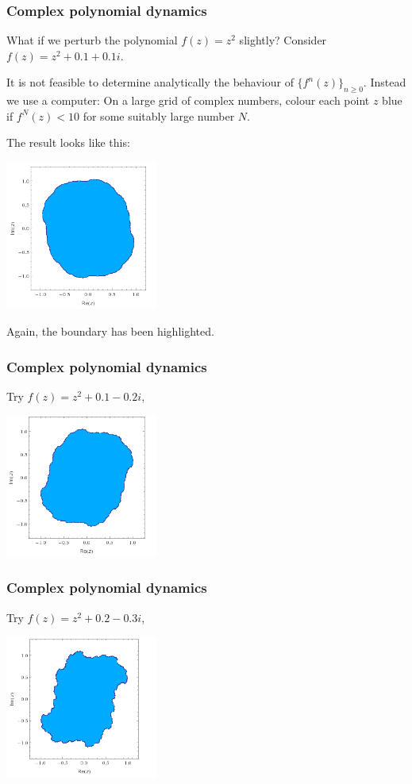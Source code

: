 \documentclass{beamer} %
\theoremstyle{definition} %
\begin{document}
\begin{frame}\frametitle{Complex polynomial dynamics}
    What if we perturb the polynomial $f(z)=z^2$ slightly? Consider $f(z) = z^2+0.1+0.1i$. 
    
    It is not feasible to determine analytically the behaviour of $\{f^n(z)\}_{n\geq 0}$.
    Instead we use a computer: On a large grid of complex numbers, colour each point $z$
    blue if $f^N(z) < 10$ for some suitably large number $N$.
    
    The result looks like this:
    \begin{center}
        \includegraphics[width=50mm]{img/julia0101-filled.png}
    \end{center}
    Again, the boundary has been highlighted.
\end{frame}

\begin{frame}\frametitle{Complex polynomial dynamics}
    Try $f(z) = z^2+0.1-0.2i$,\\
    \begin{center}
        \includegraphics[width=50mm]{img/julia01-02-filled.png}
    \end{center}
\end{frame}

\begin{frame}\frametitle{Complex polynomial dynamics}
    Try $f(z) = z^2+0.2-0.3i$,\\
    \begin{center}
        \includegraphics[width=50mm]{img/julia02-03-filled.png}
    \end{center}
\end{frame}
\end{document}
